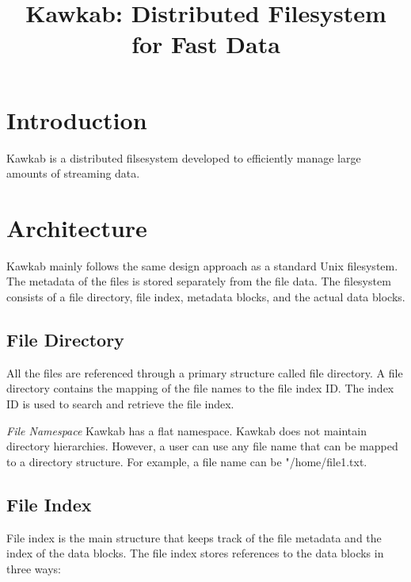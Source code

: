 \documentclass[]{article}
\newcommand{\subtopic}[1]{\vspace{1.5pt} \noindent \textit{#1}}
\begin{document}
\title{Kawkab: Distributed Filesystem for Fast Data}
\maketitle

\section{Introduction} Kawkab is a distributed filsesystem developed to
efficiently manage large amounts of streaming data.

\section{Architecture} Kawkab mainly follows the same design approach as a
standard Unix filesystem. The metadata of the files is stored separately from
the file data.  The filesystem consists of a file directory, file index,
metadata blocks, and the actual data blocks.

\subsection{File Directory} All the files are referenced through a primary
structure called file directory. A file directory contains the mapping of the
file names to the file index ID.  The index ID is used to search and retrieve
the file index.

\subtopic{File Namespace} Kawkab has a flat namespace. Kawkab does not maintain
directory hierarchies. However, a user can use any file name that can be mapped
to a directory structure. For example, a file name can be "/home/file1.txt.

\subsection{File Index}
File index is the main structure that keeps track of the file metadata and the
index of the data blocks.
The file index stores references to the data blocks in three ways:
\end{document}
